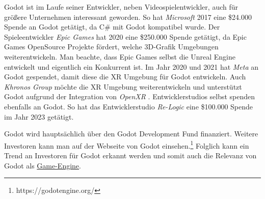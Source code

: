 Godot ist im Laufe seiner Entwickler, neben Videospielentwickler, auch f\"{u}r gr\"{o}\ss{}ere Unternehmen interessant geworden. So hat \textit{Microsoft} 2017 eine \$24.000 Spende an Godot get\"{a}tigt, da C# mit Godot kompatibel wurde. Der Spieleentwickler \textit{Epic Games} hat 2020 eine \$250.000 Spende get\"{a}tigt, da Epic Games OpenSource Projekte f\"{o}rdert, welche 3D-Grafik Umgebungen weiterentwickeln.\autocite{megagrant} Man beachte, dass Epic Games selbst die Unreal Engine entwickelt und eigentlich ein Konkurrent ist. Im Jahr 2020 und 2021 hat \textit{Meta} an Godot gespendet, damit diese die XR Umgebung f\"{u}r Godot entwickeln. Auch \textit{Khronos Group} m\"{o}chte die XR Umgebung weiterentwickeln und unterst\"{u}tzt Godot aufgrund der Integration von \textit{OpenXR} \autocite{khronos}. Entwicklerstudios selbst spenden ebenfalls an Godot. So hat das Entwicklerstudio \textit{Re-Logic} eine \$100.000 Spende im Jahr 2023 get\"{a}tigt.\autocite{gdfd2023} 

Godot wird haupts\"{a}chlich \"{u}ber den Godot Development Fund finanziert. Weitere Investoren kann man auf der Webseite von Godot einsehen.\footnote{https://godotengine.org/} Folglich kann ein Trend an Investoren f\"{u}r Godot erkannt werden und somit auch die Relevanz von Godot als \hyperref[chap:game engines]{Game-Engine}.




